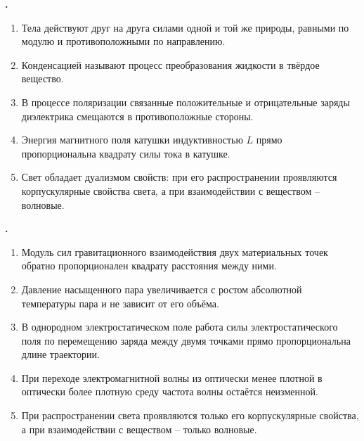 \documentclass[12pt,a4paper]{article}
\newif\ifShowSolutions
\newcounter{banktask}
\newcommand{\BankTask}[3]{%
  \refstepcounter{banktask}%
  \Needspace{35mm}\par\medskip\noindent\begin{minipage}{\linewidth}%
  \noindent\textbf{\thebanktask.}\quad #2\par
  \ifShowSolutions
    #3\par
    \ifdefined\TutorEdition
      \ifcsname TutorSource#1\endcsname
        \smallskip{\small\csname TutorSource#1\endcsname\par}%
      \fi
    \fi
  \fi
  \end{minipage}\par\medskip
}
\begin{document}
\BankTask{0FDA4F}{
\begin{enumerate}
\item Тела действуют друг на друга силами одной и той же природы, равными по модулю и противоположными по направлению.
\item Конденсацией называют процесс преобразования жидкости в твёрдое вещество.
\item В процессе поляризации связанные положительные и отрицательные заряды диэлектрика смещаются в противоположные стороны.
\item Энергия магнитного поля катушки индуктивностью \(L\) прямо пропорциональна квадрату силы тока в катушке.
\item Свет обладает дуализмом свойств: при его распространении проявляются корпускулярные свойства света, а при взаимодействии с веществом -- волновые.
\end{enumerate}
}{
\smallskip\noindent\textbf{Решение от GPT}\par
1) Верно по третьему закону Ньютона: \(\vec F_{12}=-\vec F_{21}\), силы имеют одну природу. 2) Неверно: конденсация — переход из газообразного состояния в жидкое. 3) Верно: при поляризации связанные заряды противоположных знаков смещаются в противоположные стороны. 4) Верно, поскольку \(W=LI^2/2\). 5) Неверно: при распространении света проявляются волновые свойства, а при поглощении и испускании — корпускулярные. Ответ: \(1,\,3,\,4\).
}

\BankTask{A1CBB8}{
\begin{enumerate}
\item Модуль сил гравитационного взаимодействия двух материальных точек обратно пропорционален квадрату расстояния между ними.
\item Давление насыщенного пара увеличивается с ростом абсолютной температуры пара и не зависит от его объёма.
\item В однородном электростатическом поле работа силы электростатического поля по перемещению заряда между двумя точками прямо пропорциональна длине траектории.
\item При переходе электромагнитной волны из оптически менее плотной в оптически более плотную среду частота волны остаётся неизменной.
\item При распространении света проявляются только его корпускулярные свойства, а при взаимодействии с веществом -- только волновые.
\end{enumerate}
}{
\smallskip\noindent\textbf{Решение от GPT}\par
1) Верно: \(F=Gm_1m_2/r^2\). 2) Верно: давление насыщенного пара растёт с температурой и при данной температуре не зависит от объёма, пока пар остаётся насыщенным. 3) Неверно: \(A=q(\varphi_1-\varphi_2)\), работа зависит от конечных точек, а не от длины траектории. 4) Верно: при переходе через границу сред частота сохраняется, \(\nu_1=\nu_2\). 5) Неверно: свет проявляет волновые свойства при интерференции и дифракции, а корпускулярные — например, при фотоэффекте. Ответ: \(1,\,2,\,4\).
}
\end{document}
